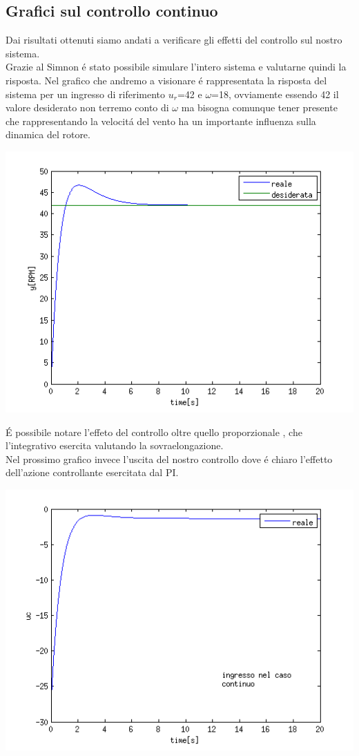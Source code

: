 \documentclass[a4paper,13pt]{article}
\begin{document}
\subsection{Grafici sul controllo continuo}
Dai risultati ottenuti siamo andati a verificare gli effetti del controllo sul nostro sistema. \\
Grazie al Simnon \'e stato possibile simulare l'intero sistema e valutarne quindi la risposta.
Nel grafico che andremo a visionare \'e rappresentata la risposta del sistema per un ingresso di riferimento $u_r$=42 e $\omega$=18, ovviamente essendo 42 il valore desiderato non terremo conto di $\omega$ ma bisogna comunque tener presente che rappresentando la velocit\'a del vento ha un importante influenza sulla dinamica del rotore.
\begin{center}
\includegraphics[scale=0.6]{graph/ycont.png}
\end{center}
\'E possibile notare l'effeto del controllo oltre quello proporzionale ,
che l'integrativo esercita valutando la sovraelongazione.\\
Nel prossimo grafico invece l'uscita del nostro controllo dove \'e chiaro l'effetto dell'azione controllante esercitata dal PI. 
\begin{center}
\includegraphics[scale=0.6]{graph/ucont.png}
\end{center}
\end{document}
